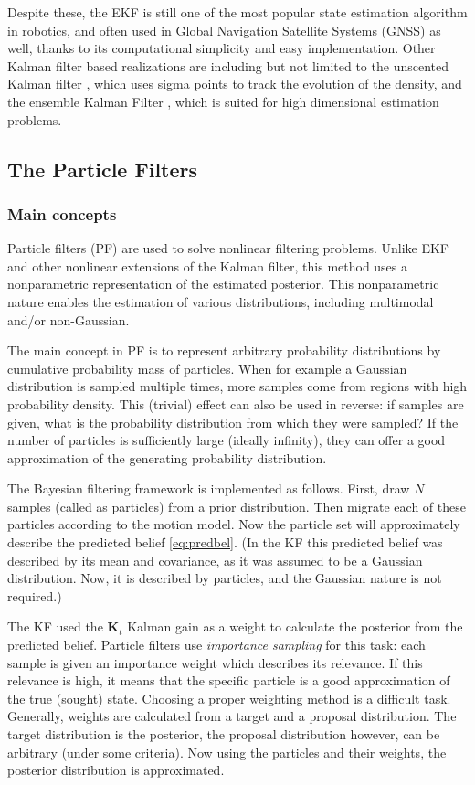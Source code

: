 Despite these, the EKF is still one of the most popular state estimation algorithm in robotics, and often used in Global Navigation Satellite Systems (GNSS) as well, thanks to its computational simplicity and easy  implementation. Other Kalman filter based realizations are including but not limited to the unscented Kalman filter \cite{Julier2004}, which uses sigma points to track the evolution of the density, and the ensemble Kalman Filter \cite{Evensen2003}, which is suited for high dimensional estimation problems.

\subsection{The Particle Filters}
\subsubsection{Main concepts}

Particle filters (PF) are used to solve nonlinear filtering problems. Unlike EKF and other nonlinear extensions of the Kalman filter, this method uses a nonparametric representation of the estimated posterior. This nonparametric nature enables the estimation of various distributions, including multimodal and/or non-Gaussian.

The main concept in PF is to represent arbitrary probability distributions by cumulative probability mass of particles. When for example a Gaussian distribution is sampled multiple times, more samples come from regions with high probability density. This (trivial) effect can also be used in reverse: if samples are given, what is the probability distribution from which they were sampled? If the number of particles is sufficiently large (ideally infinity), they can offer a good approximation of the generating probability distribution.

The Bayesian filtering framework is implemented as follows. First, draw $N$ samples (called as particles) from a prior distribution. Then migrate each of these particles according to the motion model. Now the particle set will approximately describe the predicted belief \eqref{eq:predbel}. (In the KF this predicted belief was described by its mean and covariance, as it was assumed to be a Gaussian distribution. Now, it is described by particles, and the Gaussian nature is not required.)

The KF used the $\mathbf{K}_t$ Kalman gain as a weight to calculate the posterior from the predicted belief. Particle filters use \emph{importance sampling} for this task: each sample is given an importance weight which describes its relevance. If this relevance is high, it means that the specific particle is a good approximation of the true (sought) state. Choosing a proper weighting method is a difficult task. Generally, weights are calculated from a target and a proposal distribution. The target distribution is the posterior, the proposal distribution however, can be arbitrary (under some criteria). Now using the particles and their weights, the posterior distribution is approximated.

